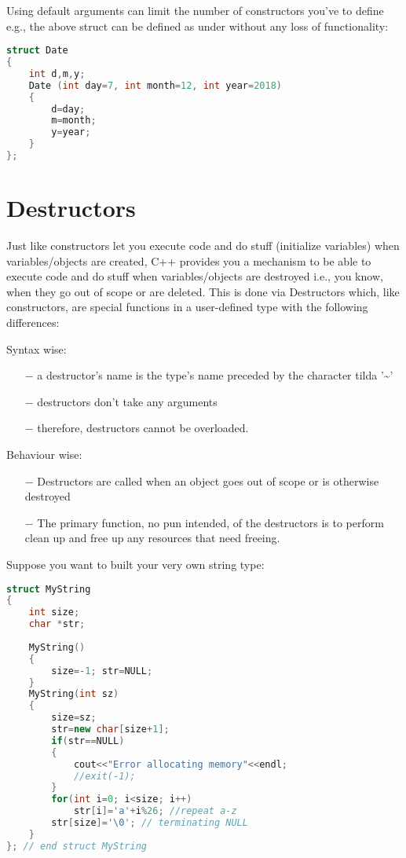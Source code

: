 \documentclass[11pt,fleqn]{book} %
\begin{document}
Using default arguments can limit the number of constructors you've to define e.g., the above struct can be defined as under without any loss of functionality:
\begin{lstlisting}[language=C++, caption = Default arguments]
struct Date 
{
	int d,m,y;
	Date (int day=7, int month=12, int year=2018)
	{
		d=day;
		m=month;
		y=year;
	}
};
\end{lstlisting}



\section{Destructors}
Just like constructors let you execute code and do stuff (initialize variables) when variables/objects are created, C++ provides you a mechanism to be able to execute code and do stuff when variables/objects are destroyed i.e., you know, when they go out of scope or are deleted. This is done via Destructors which, like constructors, are special functions in a user-defined type with the following differences:

\noindent Syntax wise:
\begin{itemize}
	\item[$-$] a destructor's name is the type's name preceded by the character tilda '\textasciitilde'
	\item[$-$] destructors don't take any arguments
	\item[$-$] therefore, destructors cannot be overloaded.
\end{itemize}

\noindent Behaviour wise:
\begin{itemize}
	\item[$-$] Destructors are called when an object goes out of scope or is otherwise destroyed
	\item[$-$] The primary function, no pun intended, of the destructors is to perform clean up and free up any resources that need freeing.
\end{itemize}
Suppose you want to built your very own string type:
\begin{lstlisting}[language=C++, caption = struct MyString]
struct MyString 
{
	int size;
	char *str;
	
	MyString()
	{
		size=-1; str=NULL;
	} 
	MyString(int sz)
	{
		size=sz;
		str=new char[size+1];
		if(str==NULL)
		{
			cout<<"Error allocating memory"<<endl;
			//exit(-1);
		} 
		for(int i=0; i<size; i++)
			str[i]='a'+i%26; //repeat a-z
		str[size]='\0'; // terminating NULL
	}
}; // end struct MyString
\end{lstlisting}
\end{document}
